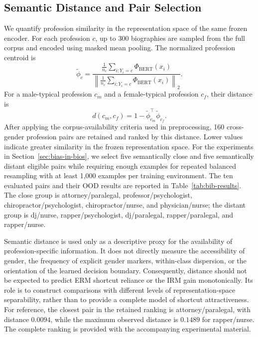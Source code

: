 \documentclass[11pt]{article}
\theoremstyle{definition}
\theoremstyle{plain}
\newcommand{\professionpair}[2]{#1/\allowbreak#2}
\begin{document}
\subsection{Semantic Distance and Pair Selection}
\label{app:bib-semantic-distance}

We quantify profession similarity in the representation space of the same frozen encoder. For each profession $c$, up to 300 biographies are sampled from the full corpus and encoded using masked mean pooling. The normalized profession centroid is
\begin{equation}
\tilde{\phi}_c = \frac{ \frac{1}{n_c}\sum_{i:Y_i=c}\Phi_{\mathrm{BERT}}(x_i) }{ \left\| \frac{1}{n_c}\sum_{i:Y_i=c}\Phi_{\mathrm{BERT}}(x_i) \right\|_2 }.
\label{eq:bib-centroid}
\end{equation}
For a male-typical profession $c_m$ and a female-typical profession $c_f$, their distance is
\begin{equation}
d(c_m,c_f) = 1-\tilde{\phi}_{c_m}^{\top}\tilde{\phi}_{c_f}.
\label{eq:bib-cosine-distance}
\end{equation}
After applying the corpus-availability criteria used in preprocessing, 160 cross-gender profession pairs are retained and ranked by this distance. Lower values indicate greater similarity in the frozen representation space. For the experiments in Section~\ref{sec:bias-in-bios}, we select five semantically close and five semantically distant eligible pairs while requiring enough examples for repeated balanced resampling with at least 1,000 examples per training environment. The ten evaluated pairs and their OOD results are reported in Table~\ref{tab:bib-results}. The close group is \professionpair{attorney}{paralegal}, \professionpair{professor}{psychologist}, \professionpair{chiropractor}{psychologist}, \professionpair{chiropractor}{nurse}, and \professionpair{physician}{nurse}; the distant group is \professionpair{dj}{nurse}, \professionpair{rapper}{psychologist}, \professionpair{dj}{paralegal}, \professionpair{rapper}{paralegal}, and \professionpair{rapper}{nurse}.

Semantic distance is used only as a descriptive proxy for the availability of profession-specific information. It does not directly measure the accessibility of gender, the frequency of explicit gender markers, within-class dispersion, or the orientation of the learned decision boundary. Consequently, distance should not be expected to predict ERM shortcut reliance or the IRM gain monotonically. Its role is to construct comparisons with different levels of representation-space separability, rather than to provide a complete model of shortcut attractiveness. For reference, the closest pair in the retained ranking is \professionpair{attorney}{paralegal}, with distance $0.0094$, while the maximum observed distance is $0.1489$ for \professionpair{rapper}{nurse}. The complete ranking is provided with the accompanying experimental material.
\end{document}
